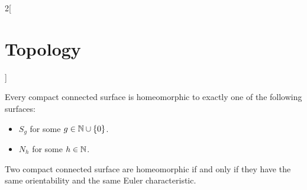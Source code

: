 \documentclass[../../../main.tex]{subfiles}
\begin{document}
\begin{multicols}{2}[\section{Topology}]
\begin{theorem}
    Every compact connected surface is homeomorphic to exactly one of the following surfaces:
    \begin{itemize}
      \item $S_g$ for some $g\in\mathbb{N}\cup\{0\}$.
      \item $N_h$ for some $h\in\mathbb{N}$.
    \end{itemize}
  \end{theorem}
  \begin{corollary}
    Two compact connected surface are homeomorphic if and only if they have the same orientability and the same Euler characteristic.
  \end{corollary}
\end{multicols}
\end{document}
